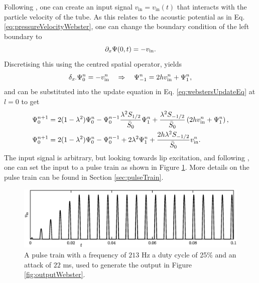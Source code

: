 Following \cite{Bilbao2018}, one can create an input signal $v_\text{in} = v_\text{in}(t)$ that interacts with the particle velocity of the tube. As this relates to the acoustic potential as in Eq. \eqref{eq:pressureVelocityWebster}, one can change the boundary condition of the left boundary to
\begin{equation}
    \partial_x \Psi(0, t) = - v_\text{in}.
\end{equation}
Discretising this using the centred spatial operator, yields
\begin{equation}
    \delta_{x\cdot} \Psi_0^n = -v_\text{in}^n \quad \Rightarrow \quad \Psi_{-1}^n = 2h v_\text{in}^n + \Psi_1^n,
\end{equation}
and can be substituted into the update equation in Eq. \eqref{eq:webstersUpdateEq} at $l=0$ to get
\begin{align}
    \Psi_0^{n+1} &= 2(1-\lambda^2)\Psi_0^n-\Psi_0^{n-1} \frac{\lambda^2S_{1/2}}{\bar{S}_0}\Psi_1^n + \frac{\lambda^2S_{-1/2}}{\bar{S}_0}\left(2h v_\text{in}^n + \Psi_1^n\right),\nonumber\\
    \Psi_0^{n+1} &= 2(1-\lambda^2)\Psi_0^n-\Psi_0^{n-1} +2\lambda^2\Psi_1^n + \frac{2h\lambda^2S_{-1/2}}{\bar{S}_0} v_\text{in}^n.
\end{align}
The input signal is arbitrary, but looking towards lip excitation, and following \cite{theBible}, one can set the input to a pulse train as shown in Figure \ref{fig:inputWebster}. More details on the pulse train can be found in Section \ref{sec:pulseTrain}.
\begin{figure}[h]
    \centering
    \includegraphics[width=\textwidth]{figures/resonators/brass/inputWebster.eps}
    \caption{A pulse train with a frequency of $213$ Hz a duty cycle of 25\% and an attack of $22$ ms, used to generate the output in Figure \ref{fig:outputWebster}. \label{fig:inputWebster}}
\end{figure}




